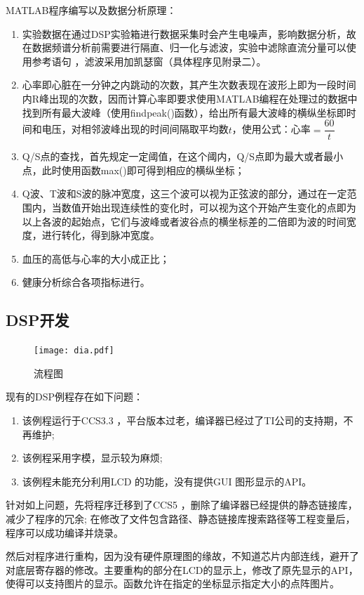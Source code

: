 \documentclass{article}
\newcounter{sub}
\begin{document}
MATLAB程序编写以及数据分析原理：

\begin{enumerate}
	\item 实验数据在通过DSP实验箱进行数据采集时会产生电噪声，影响数据分析，故在数据频谱分析前需要进行隔直、归一化与滤波，实验中滤除直流分量可以使用参考语句 ，滤波采用加凯瑟窗（具体程序见附录二）。
	\item 心率即心脏在一分钟之内跳动的次数，其产生次数表现在波形上即为一段时间内R峰出现的次数，因而计算心率即要求使用MATLAB编程在处理过的数据中找到所有最大波峰（使用findpeak()函数），给出所有最大波峰的横纵坐标即时间和电压，对相邻波峰出现的时间间隔取平均数$ t $，使用公式：心率$ = \dfrac{60}{t} $
	\item Q/S点的查找，首先规定一定阈值，在这个阈内，Q/S点即为最大或者最小点，此时使用函数max()即可得到相应的横纵坐标；
	\item Q波、T波和S波的脉冲宽度，这三个波可以视为正弦波的部分，通过在一定范围内，当数值开始出现连续性的变化时，可以视为这个开始产生变化的点即为以上各波的起始点，它们与波峰或者波谷点的横坐标差的二倍即为波的时间宽度，进行转化，得到脉冲宽度。
	\item 血压的高低与心率的大小成正比；
	\item 健康分析综合各项指标进行。
\end{enumerate}

\subsection{DSP开发}%
\label{sub:DSP开发}

\begin{figure}[H]
	\centering
	\texttt{[image: dia.pdf]}
	\caption{流程图}
	\label{fig:流程图}
\end{figure}

现有的DSP例程存在如下问题：

\begin{enumerate}
	\item 该例程运行于CCS3.3 ，平台版本过老，编译器已经过了TI公司的支持期，不再维护;
	\item 该例程采用字模，显示较为麻烦;
	\item 该例程未能充分利用LCD 的功能，没有提供GUI 图形显示的API。
\end{enumerate}

针对如上问题，先将程序迁移到了CCS5 ，删除了编译器已经提供的静态链接库，减少了程序的冗余; 在修改了文件包含路径、静态链接库搜索路径等工程变量后，程序可以成功编译并烧录。

然后对程序进行重构，因为没有硬件原理图的缘故，不知道芯片内部连线，避开了对底层寄存器的修改。主要重构的部分在LCD的显示上，修改了原先显示的API，使得可以支持图片的显示。函数允许在指定的坐标显示指定大小的点阵图片。
\end{document}

